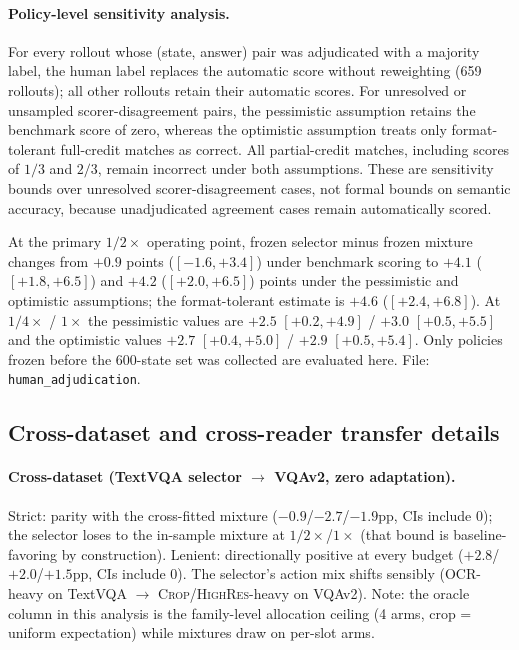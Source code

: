 \documentclass[10pt]{article}
\begin{document}
\paragraph{Policy-level sensitivity analysis.}
For every rollout whose (state, answer) pair was adjudicated with a
majority label, the human label replaces the automatic score without
reweighting (659 rollouts); all other rollouts retain their automatic
scores. For unresolved or unsampled scorer-disagreement pairs, the
pessimistic assumption retains the benchmark score of zero, whereas the
optimistic assumption treats only format-tolerant full-credit matches as
correct. All partial-credit matches, including scores of $1/3$ and $2/3$,
remain incorrect under both assumptions. These are sensitivity bounds over unresolved
scorer-disagreement cases, not formal bounds on semantic accuracy, because
unadjudicated agreement cases remain automatically scored.

At the primary $1/2\times$ operating point, frozen selector minus frozen
mixture changes from $+0.9$ points ($[-1.6, +3.4]$) under benchmark scoring
to $+4.1$ ($[+1.8, +6.5]$) and $+4.2$ ($[+2.0, +6.5]$) points under the
pessimistic and optimistic assumptions; the format-tolerant estimate is
$+4.6$ ($[+2.4, +6.8]$). At $1/4\times$ / $1\times$ the pessimistic values
are $+2.5$ $[+0.2, +4.9]$ / $+3.0$ $[+0.5, +5.5]$ and the optimistic values
$+2.7$ $[+0.4, +5.0]$ / $+2.9$ $[+0.5, +5.4]$. Only policies frozen
before the 600-state set was collected are evaluated here. File:
\texttt{human\_adjudication}.

\subsection{Cross-dataset and cross-reader transfer details}

\paragraph{Cross-dataset (TextVQA selector $\to$ VQAv2, zero adaptation).}
Strict: parity with the cross-fitted mixture ($-0.9$/$-2.7$/$-1.9$pp, CIs
include 0); the selector loses to the in-sample mixture at
$1/2\times$/$1\times$ (that bound is baseline-favoring by construction).
Lenient: directionally positive at every budget ($+2.8$/$+2.0$/$+1.5$pp,
CIs include 0). The selector's action mix shifts sensibly (OCR-heavy on
TextVQA $\to$ \textsc{Crop}/\textsc{HighRes}-heavy on VQAv2). Note: the
oracle column in this analysis is the family-level allocation ceiling
(4 arms, crop = uniform expectation) while mixtures draw on per-slot arms.
\end{document}
